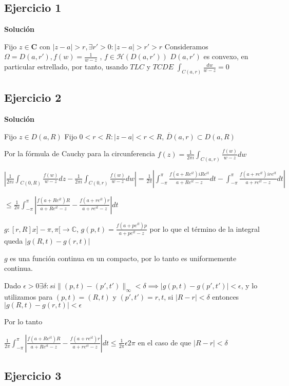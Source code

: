 \subsection{Ejercicio 1}


\textbf{Solución}

Fijo $z\in\mathbf{C}$ con $|z-a|>r, \exists r'>0 : |z-a|>r'>r$
Consideramos $\Omega = D(a,r'), f(w) = \frac{1}{w-z}$ , $f\in\mathcal{H}(D(a,r'))$
$D(a,r')$ es convexo, en particular estrellado, por tanto, usando $TLC$ y $TCDE$ $\int_{C(a,r)} \frac{dw}{w-z} = 0$

\subsection{Ejercicio 2}


\textbf{Solución}

Fijo $z\in D(a,R)$
Fijo $0<r<R : |z-a|<r<R$, $\overline{D}(a,r) \subset D(a,R)$

Por la fórmula de Cauchy para la circunferencia $f(z) = \frac{1}{2\pi i} \int_{C(a,r)} \frac{f(w)}{w-z} dw$

$ \left|\frac{1}{2\pi i} \int_{C(0,R)} \frac{f(w)}{w-z} dz - \frac{1}{2\pi i} \int_{C(0,r)} \frac{f(w)}{w-z}dw \right| = \frac{1}{2\pi} |\int_{-\pi}^{\pi} \frac{f(a+Re^{it}) iRe^{it} }{ a+Re^{it}-z } dt - \int_{-\pi}^{\pi} \frac{f(a+re^{it}) ire^{it}}{a+re^{it}-z} dt|$

$\leq \frac{1}{2\pi} \int_{-\pi}^{\pi} \left| \frac{f(a+Re^{it})R}{a+Re^{it}-z} -\frac{f(a+re^{it})r}{a+re^{it}-z} \right| dt$

$g:[r,R]x]-\pi, \pi[ \rightarrow \mathbb{C}$,
$g(p,t) = \frac{f(a+pe^{it})p}{a+pe^{it}-z}$
por lo que el término de la integral queda $|g(R,t)-g(r,t)|$

$g$ es una función continua en un compacto, por lo tanto es uniformemente continua.

Dado $\epsilon >0 \exists \delta : si \| (p,t)-(p',t') \| _{\infty}<\delta \implies |g(p,t)-g(p',t')| < \epsilon$,
y lo utilizamos para $(p,t)=(R,t)$ y $(p',t')=r,t$, si $|R-r|<\delta$ entonces $|g(R,t)-g(r,t)| < \epsilon$

Por lo tanto

$\frac{1}{2\pi} \int_{-\pi}^{\pi} \left| \frac{f(a+Re^{it})R}{a+Re^{it}-z} -\frac{f(a+re^{it})r}{a+re^{it}-z} \right| dt \leq \frac{1}{2\pi}\epsilon 2\pi$ en el caso de que $|R-r|<\delta$


\subsection{Ejercicio 3}

